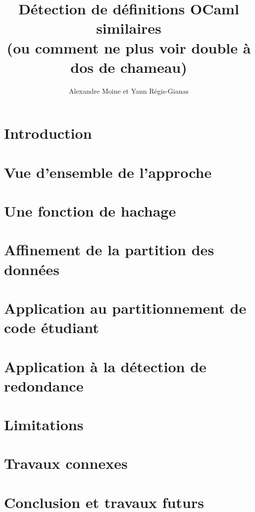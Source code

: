 \documentclass[a4paper]{easychair}
\title{Détection de définitions OCaml similaires \\
(ou comment ne plus voir double à dos de chameau)}
\author{Alexandre Moine et Yann Régis-Gianas}
\institute{Université de Paris}
\begin{document}
\maketitle

\begin{abstract}

\end{abstract}

\section{Introduction}


\section{Vue d'ensemble de l'approche}
\label{sec:overview}


\section{Une fonction de hachage}
\label{sec:hash}


\section{Affinement de la partition des données}
\label{sec:clustering}


\section{Application au partitionnement de code étudiant}
\label{sec:partition}


\section{Application à la détection de redondance}
\label{sec:redundancy}


\section{Limitations}
\label{sec:limitations}


\section{Travaux connexes}
\label{sec:related-work}


\section{Conclusion et travaux futurs}
\label{sec:conclusion}





\end{document}
